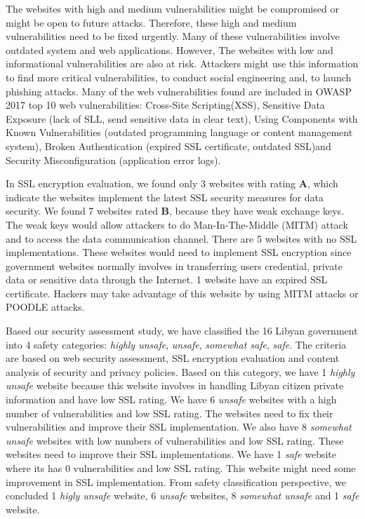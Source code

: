 \documentclass[conference]{IEEEtran}
\begin{document}
The websites with high and medium vulnerabilities might be compromised or might be open to future attacks. Therefore, these high and medium vulnerabilities need to be fixed urgently. Many of these vulnerabilities involve outdated system and web applications. However, The websites with low and informational vulnerabilities are also at risk. Attackers might use this information to find more critical vulnerabilities, to conduct social engineering and, to launch phishing attacks. Many of the web vulnerabilities found are included in OWASP 2017 top 10 web vulnerabilities: Cross-Site Scripting(XSS), Sensitive Data Exposure (lack of SLL, send sensitive data in clear text), Using Components with Known Vulnerabilities (outdated programming language or content management system), Broken Authentication (expired SSL certificate, outdated SSL)and Security Misconfiguration (application error logs).

In SSL encryption evaluation, we found only 3 websites with rating \textbf{A}, which indicate the websites implement the latest SSL security measures for data security. We found 7 websites rated \textbf{B}, because they have weak exchange keys. The weak keys would allow attackers to do Man-In-The-Middle (MITM) attack and to access the data communication channel. There are 5 websites with no SSL implementations. These websites would need to implement SSL encryption since government websites normally involves in transferring users credential, private data or sensitive data through the Internet. 1 website have an expired SSL certificate. Hackers may take advantage of this website by using MITM attacks or POODLE attacks.

Based our security assessment study, we have classified the 16 Libyan government into 4 safety categories: \emph{highly unsafe}, \emph{unsafe}, \emph{somewhat safe}, \emph{safe}. The criteria are based on web security assessment, SSL encryption evaluation and content analysis of security and privacy policies. Based on this category, we have 1 \emph{highly unsafe} website because this website involves in handling Libyan citizen private information and have low SSL rating. We have 6 \emph{unsafe} websites with a high number of vulnerabilities and low SSL rating. The websites need to fix their vulnerabilities and improve their SSL implementation. We also have 8 \emph{somewhat unsafe} websites with low numbers of vulnerabilities and low SSL rating. These websites need to improve their SSL implementations. We have 1 \emph{safe} website where its has 0 vulnerabilities and low SSL rating. This website might need some improvement in SSL implementation.
From safety classification perspective, we concluded 1 \emph{higly unsafe} website, 6 \emph{unsafe} websites, 8 \emph{somewhat unsafe} and 1 \emph{safe} website.
\end{document}
